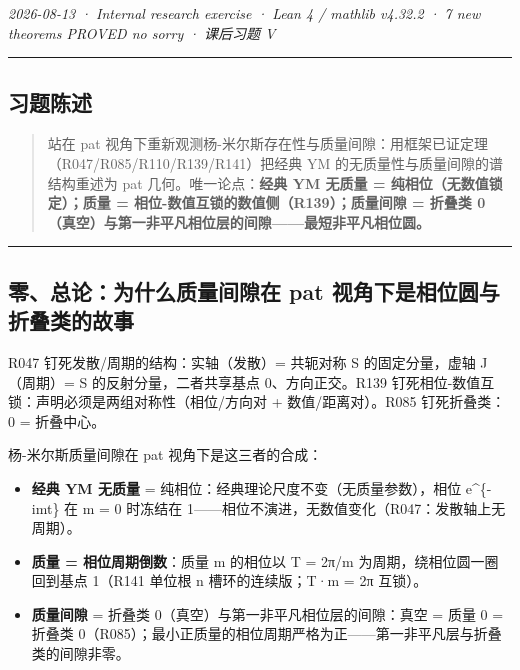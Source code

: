\documentclass[
]{article}
\providecommand{\tightlist}{%
 \setlength{\itemsep}{0pt}\setlength{\parskip}{0pt}}
\begin{document}
\emph{2026-08-13 · Internal research exercise · Lean 4 / mathlib v4.32.2
· 7 new theorems PROVED no sorry · 课后习题 V }

\begin{center}\rule{0.5\linewidth}{0.5pt}\end{center}

\subsection{习题陈述}\label{ux4e60ux9898ux9648ux8ff0}

\begin{quote}
站在 pat
视角下重新观测杨-米尔斯存在性与质量间隙：用框架已证定理（R047/R085/R110/R139/R141）把经典
YM 的无质量性与质量间隙的谱结构重述为 pat 几何。唯一论点：\textbf{经典
YM 无质量 = 纯相位（无数值锁定）；质量 =
相位-数值互锁的数值侧（R139）；质量间隙 = 折叠类
0（真空）与第一非平凡相位层的间隙------最短非平凡相位圆。}
\end{quote}

\begin{center}\rule{0.5\linewidth}{0.5pt}\end{center}

\subsection{零、总论：为什么质量间隙在 pat
视角下是相位圆与折叠类的故事}\label{ux96f6ux603bux8bbaux4e3aux4ec0ux4e48ux8d28ux91cfux95f4ux9699ux5728-pat-ux89c6ux89d2ux4e0bux662fux76f8ux4f4dux5706ux4e0eux6298ux53e0ux7c7bux7684ux6545ux4e8b}

 R047 钉死发散/周期的结构：实轴（发散）= 共轭对称 S
的固定分量，虚轴 J（周期）= S 的反射分量，二者共享基点 0、方向正交。R139
钉死相位-数值互锁：声明必须是两组对称性（相位/方向对 +
数值/距离对）。R085 钉死折叠类：0 = 折叠中心。

杨-米尔斯质量间隙在 pat 视角下是这三者的合成：

\begin{itemize}
\tightlist
\item
 \textbf{经典 YM 无质量} = 纯相位：经典理论尺度不变（无质量参数），相位
 e\^{}\{-imt\} 在 m = 0 时冻结在
 1------相位不演进，无数值变化（R047：发散轴上无周期）。
\item
 \textbf{质量 = 相位周期倒数}：质量 m 的相位以 T = 2π/m
 为周期，绕相位圆一圈回到基点 1（R141 单位根 n 槽环的连续版；T·m = 2π
 互锁）。
\item
 \textbf{质量间隙} = 折叠类 0（真空）与第一非平凡相位层的间隙：真空 =
 质量 0 = 折叠类
 0（R085）；最小正质量的相位周期严格为正------第一非平凡层与折叠类的间隙非零。
\end{itemize}
\end{document}

